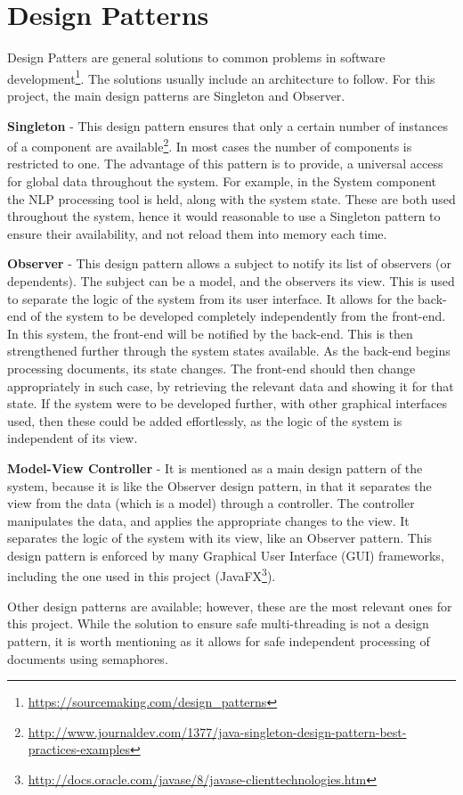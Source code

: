 \section{Design Patterns}
\par Design Patters are general solutions to common problems in software development\footnote{\url{https://sourcemaking.com/design_patterns}}. The solutions usually include an architecture to follow. For this project, the main design patterns are Singleton and Observer.
\par \textbf{Singleton} - This design pattern ensures that only a certain number of instances of a component are available\footnote{\url{http://www.journaldev.com/1377/java-singleton-design-pattern-best-practices-examples}}. In most cases the number of components is restricted to one. The advantage of this pattern is to provide, a universal access for global data throughout the system. For example, in the System component the NLP processing tool is held, along with the system state. These are both used throughout the system, hence it would reasonable to use a Singleton pattern to ensure their availability, and not reload them into memory each time.
\par \textbf{Observer} - This design pattern allows a subject to notify its list of observers (or dependents). The subject can be a model, and the observers its view. This is used to separate the logic of the system from its user interface. It allows for the back-end of the system to be developed completely independently from the front-end. In this system, the front-end will be notified by the back-end. This is then strengthened further through the system states available. As the back-end begins processing documents, its state changes. The front-end should then change appropriately in such case, by retrieving the relevant data and showing it for that state. If the system were to be developed further, with other graphical interfaces used, then these could be added effortlessly, as the logic of the system is independent of its view.
\par \textbf{Model-View Controller} - It is mentioned as a main design pattern of the system, because it is like the Observer design pattern, in that it separates the view from the data (which is a model) through a controller. The controller manipulates the data, and applies the appropriate changes to the view. It separates the logic of the system with its view, like an Observer pattern. This design pattern is enforced by many Graphical User Interface (GUI) frameworks, including the one used in this project (JavaFX\footnote{\url{http://docs.oracle.com/javase/8/javase-clienttechnologies.htm}}). 
\par Other design patterns are available; however, these are the most relevant ones for this project. While the solution to ensure safe multi-threading is not a design pattern, it is worth mentioning as it allows for safe independent processing of documents using semaphores. 



